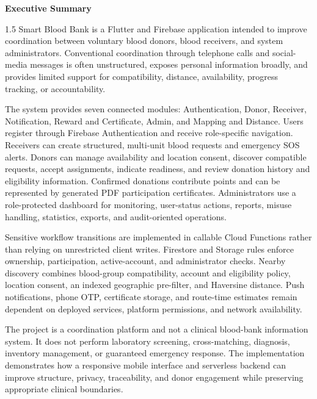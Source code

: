 \newpage
\thispagestyle{plain}
\begin{center}
\textbf{\LARGE Executive Summary}
\end{center}
\vspace{1cm}
\begin{spacing}{1.5}
Smart Blood Bank is a Flutter and Firebase application intended to improve coordination between voluntary blood donors, blood receivers, and system administrators. Conventional coordination through telephone calls and social-media messages is often unstructured, exposes personal information broadly, and provides limited support for compatibility, distance, availability, progress tracking, or accountability.

The system provides seven connected modules: Authentication, Donor, Receiver, Notification, Reward and Certificate, Admin, and Mapping and Distance. Users register through Firebase Authentication and receive role-specific navigation. Receivers can create structured, multi-unit blood requests and emergency SOS alerts. Donors can manage availability and location consent, discover compatible requests, accept assignments, indicate readiness, and review donation history and eligibility information. Confirmed donations contribute points and can be represented by generated PDF participation certificates. Administrators use a role-protected dashboard for monitoring, user-status actions, reports, misuse handling, statistics, exports, and audit-oriented operations.

Sensitive workflow transitions are implemented in callable Cloud Functions rather than relying on unrestricted client writes. Firestore and Storage rules enforce ownership, participation, active-account, and administrator checks. Nearby discovery combines blood-group compatibility, account and eligibility policy, location consent, an indexed geographic pre-filter, and Haversine distance. Push notifications, phone OTP, certificate storage, and route-time estimates remain dependent on deployed services, platform permissions, and network availability.

The project is a coordination platform and not a clinical blood-bank information system. It does not perform laboratory screening, cross-matching, diagnosis, inventory management, or guaranteed emergency response. The implementation demonstrates how a responsive mobile interface and serverless backend can improve structure, privacy, traceability, and donor engagement while preserving appropriate clinical boundaries.
\end{spacing}
\newpage
